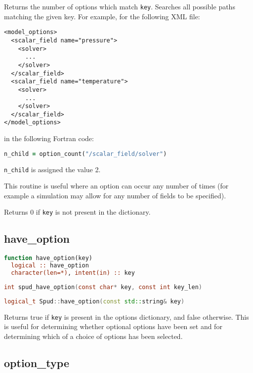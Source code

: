 \documentclass[a4paper, 11pt]{book}
\begin{document}
Returns the number of options which match \lstinline+key+. Searches all possible
paths matching the given key. For example, for the following XML file:

\begin{verbatim}
<model_options>
  <scalar_field name="pressure">
    <solver>
      ...
    </solver>
  </scalar_field>
  <scalar_field name="temperature">
    <solver>
      ...
    </solver>
  </scalar_field>
</model_options>
\end{verbatim}

in the following Fortran code:

\begin{lstlisting}[language=fortran]
n_child = option_count("/scalar_field/solver")
\end{lstlisting}

\lstinline+n_child+ is assigned the value 2.

This routine is useful where an option can occur any number of times (for
example a simulation may allow for any number of fields to be specified).

Returns 0 if \lstinline+key+ is not present in the dictionary.

\subsection{have\_option}

\begin{lstlisting}[language=fortran]
function have_option(key)
  logical :: have_option
  character(len=*), intent(in) :: key
\end{lstlisting}

\begin{lstlisting}[language=C]
int spud_have_option(const char* key, const int key_len)
\end{lstlisting}

\begin{lstlisting}[language=C++]
logical_t Spud::have_option(const std::string& key)
\end{lstlisting}

Returns true if \lstinline+key+ is present in the options dictionary, and
false otherwise. This is useful for determining whether optional options have
been set and for determining which of a choice of options has been selected.

\subsection{option\_type}\label{sec:option_type}
\end{document}
